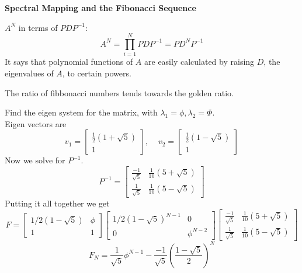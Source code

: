 \documentclass[letter]{article}
\newenvironment{menumerate}{\edef\backupindent{\the\parindent}
  \enumerate\setlength{\parindent}{\backupindent}}
  {\endenumerate}
\begin{document}
\begin{menumerate}
    \newpage
    \item \textbf{Spectral Mapping and the Fibonacci Sequence}
    \begin{menumerate}
        \item $A^N$ in terms of $PDP^{-1}$:
        \begin{equation*}
            A^N = \prod_{i=1}^N PDP^{-1} = PD^NP^{-1}
        \end{equation*}
        It says that polynomial functions of $A$ are easily calculated by raising $D$, the eigenvalues of $A$, to certain powers.
        \item The ratio of fibbonacci numbers tends towards the golden ratio.
        \item Find the eigen system for the matrix, with $\lambda_1 = \phi, \lambda_2 = \Phi.$
        \\Eigen vectors are
        \begin{equation*}
            v_1 = \begin{bmatrix}
                \frac{1}{2}(1 + \sqrt{5}) \\ 1
            \end{bmatrix}, \;\;\;\;
            v_2 = \begin{bmatrix}
                \frac{1}{2}(1  -\sqrt{5}) \\ 1
            \end{bmatrix}
        \end{equation*}
        Now we solve for $P^{-1}$.
        \begin{equation*}
            P^{-1} = \begin{bmatrix}
                \frac{-1}{\sqrt{5}} & \frac{1}{10}(5 + \sqrt{5})\\
                \frac{1}{\sqrt{5}}& \frac{1}{10}(5 - \sqrt{5})
            \end{bmatrix}
        \end{equation*}
        Putting it all together we get
        \begin{equation*}
            F =
            \begin{bmatrix}
                1/2(1 - \sqrt{5}) & \phi \\
                1 & 1
            \end{bmatrix}
            \begin{bmatrix}
                1/2(1 - \sqrt{5})^{N-1} & 0 \\
                0 & \phi^{N-2}
            \end{bmatrix}\begin{bmatrix}
                \frac{-1}{\sqrt{5}} & \frac{1}{10}(5 + \sqrt{5})\\
                \frac{1}{\sqrt{5}}& \frac{1}{10}(5 - \sqrt{5})
            \end{bmatrix}
        \end{equation*}
        \begin{equation*}
            F_N = \frac{1}{\sqrt{5}} \phi^{N-1} - \frac{-1}{\sqrt{5}}(\frac{1 - \sqrt{5}}{2})^N
        \end{equation*}


\end{menumerate}
\end{menumerate}
\end{document}
